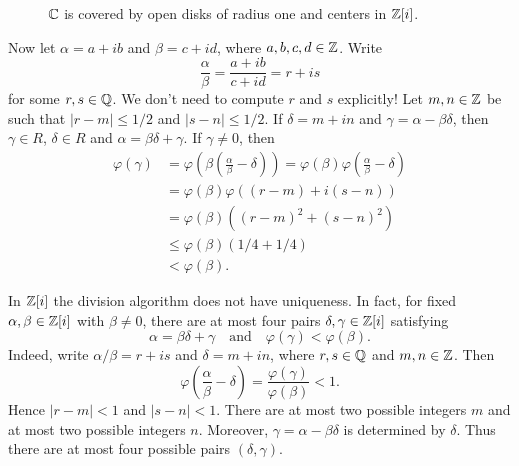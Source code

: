 \begin{example}
	\begin{figure}[ht]
		\centering
\caption{$\mathbb{C}$ is covered by open disks of radius one and centers in $\mathbb{Z}[i]$.}
\label{fig:covering}
\end{figure}
	
	Now let $\alpha=a+ib$ and $\beta=c+id$, where $a,b,c,d\in\mathbb{Z}$.  
	Write 
	\[
	\frac{\alpha}{\beta}=\frac{a+ib}{c+id}=r+is
	\]
	for some $r,s\in\mathbb{Q}$. We don't need to compute $r$ and $s$ explicitly! 
        Let $m,n\in\mathbb{Z}$ be such that $|r-m|\leq 1/2$ and 
	$|s-n|\leq 1/2$. If $\delta=m+in$ and $\gamma=\alpha-\beta\delta$, then 
	$\gamma\in R$, $\delta\in R$ and $\alpha=\beta\delta+\gamma$. If $\gamma\ne0$, then
	\begin{align*}
	\varphi(\gamma)&=\varphi\left(\beta\left(\frac{\alpha}{\beta}-\delta\right)\right)
	=\varphi(\beta)\varphi\left(\frac{\alpha}{\beta}-\delta\right)\\
	&=\varphi(\beta)\varphi((r-m)+i(s-n))\\
	&=\varphi(\beta)((r-m)^2+(s-n)^2)\\
	&\leq\varphi(\beta)(1/4+1/4)\\
	&<\varphi(\beta).
	\end{align*}	
\end{example}

In $\mathbb{Z}[i]$ the division algorithm does not have uniqueness. In fact, 
for fixed $\alpha,\beta\in\mathbb{Z}[i]$ with $\beta\ne0$, there are
at most four pairs $\delta,\gamma\in\mathbb{Z}[i]$ satisfying
\[
\alpha=\beta\delta+\gamma
\quad\text{and}\quad
\varphi(\gamma)<\varphi(\beta).
\]
Indeed, write $\alpha/\beta=r+is$ and $\delta=m+in$, where
$r,s\in\mathbb{Q}$ and $m,n\in\mathbb{Z}$. Then
\[
\varphi\left(\frac{\alpha}{\beta}-\delta\right)
=\frac{\varphi(\gamma)}{\varphi(\beta)}<1.
\]
Hence $|r-m|<1$ and $|s-n|<1$. There are at most two possible
integers $m$ and at most two possible integers $n$. Moreover,
$\gamma=\alpha-\beta\delta$ is determined by $\delta$. Thus there
are at most four possible pairs $(\delta,\gamma)$.

